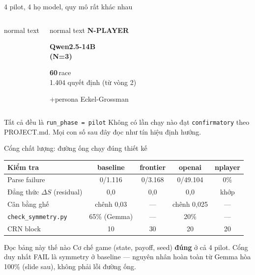 \documentclass[9pt,aspectratio=169]{beamer}
\newcommand{\bad}[1]{\textcolor{highlight}{\textbf{#1}}}
\newcommand{\good}[1]{\textcolor{proposegreen}{\textbf{#1}}}
\newcommand{\cmark}{\ding{51}}
\newcommand{\xmark}{\ding{55}}
\begin{document}
\begin{frame}{4 pilot, 4 họ model, quy mô rất khác nhau}
\begin{columns}[T,onlytextwidth]
\begin{beamercolorbox}[sep=.3cm,rounded=true]{normal text}
\end{beamercolorbox}
\begin{beamercolorbox}[sep=.3cm,rounded=true]{normal text}
{\scriptsize\bfseries\color{deepblue} N-PLAYER}\par\vspace{4pt}
{\bfseries Qwen2.5-14B\\(N=3)}\par\vspace{6pt}
{\Large\bfseries\color{skyblue} 60}\,race\\
{\small\color{gray}1.404 quyết định (từ vòng 2)}\par\vspace{4pt}
{\tiny +persona Eckel-Grossman}
\end{beamercolorbox}
\end{columns}
\vfill
\begin{alertblock}{Tất cả đều là \texttt{run\_phase = pilot}}
\small Không có lần chạy nào đạt \texttt{confirmatory} theo PROJECT.md. Mọi con số sau đây đọc như tín hiệu định hướng.
\end{alertblock}
\end{frame}

\begin{frame}{Cổng chất lượng: đường ống chạy đúng thiết kế}
\centering
\small
\renewcommand{\arraystretch}{1.35}
\begin{tabular}{lcccc}
\toprule
Kiểm tra & baseline & frontier & openai & nplayer \\
\midrule
Parse failure & \good{\cmark} 0/1.116 & \good{\cmark} 0/3.168 & \good{\cmark} 0/49.104 & \good{\cmark} 0\% \\
Đẳng thức $\Delta S$ (residual) & \good{\cmark} 0,0 & \good{\cmark} 0,0 & \good{\cmark} 0,0 & \good{\cmark} khớp \\
Cân bằng ghế & \good{\cmark} chênh 0,03 & --- & \good{\cmark} chênh 0,025 & --- \\
\texttt{check\_symmetry.py} & \bad{\xmark} 65\% (Gemma) & --- & \good{\cmark} 20\% & --- \\
CRN block & \good{\cmark} 10 & \good{\cmark} 30 & \good{\cmark} 20 & \good{\cmark} 20 \\
\bottomrule
\end{tabular}
\vspace{0.5em}
\begin{exampleblock}{Đọc bảng này thế nào}
\small Cơ chế game (state, payoff, seed) \good{đúng} ở cả 4 pilot. Cổng duy nhất FAIL là symmetry ở baseline --- nguyên nhân hoàn toàn từ Gemma hòa 100\% (slide sau), không phải lỗi đường ống.
\end{exampleblock}
\end{frame}
\end{document}
